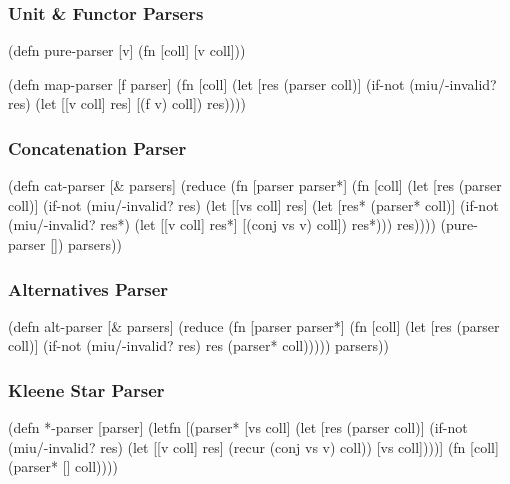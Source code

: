 \documentclass{beamer}
\begin{document}

\begin{frame}[fragile]
\frametitle{Unit \& Functor Parsers}

\begin{semiverbatim}
(defn pure-parser [v] (fn [coll] [v coll]))
\end{semiverbatim}

\begin{semiverbatim}
(defn map-parser [f parser]
  (fn [coll]
    (let [res (parser coll)]
      (if-not (miu/-invalid? res)
        (let [[v coll] res]
          [(f v) coll])
        res))))
\end{semiverbatim}

\end{frame}


\begin{frame}[fragile]
\frametitle{Concatenation Parser}

\begin{semiverbatim}
(defn cat-parser [& parsers]
  (reduce (fn [parser parser*]
            (fn [coll]
              (let [res (parser coll)]
                (if-not (miu/-invalid? res)
                  (let [[vs coll] res]
                    (let [res* (parser* coll)]
                      (if-not (miu/-invalid? res*)
                        (let [[v coll] res*]
                          [(conj vs v) coll])
                        res*)))
                  res))))
          (pure-parser []) parsers))
\end{semiverbatim}

\end{frame}


\begin{frame}[fragile]
\frametitle{Alternatives Parser}

\begin{semiverbatim}
(defn alt-parser [& parsers]
  (reduce (fn [parser parser*]
            (fn [coll]
              (let [res (parser coll)]
                (if-not (miu/-invalid? res)
                  res
                  (parser* coll)))))
          parsers))
\end{semiverbatim}

\end{frame}


\begin{frame}[fragile]
\frametitle{Kleene Star Parser}

\begin{semiverbatim}
(defn *-parser [parser]
  (letfn [(parser* [vs coll]
            (let [res (parser coll)]
              (if-not (miu/-invalid? res)
                (let [[v coll] res]
                  (recur (conj vs v) coll))
                [vs coll])))]
    (fn [coll] (parser* [] coll))))
\end{semiverbatim}

\end{frame}
\end{document}
